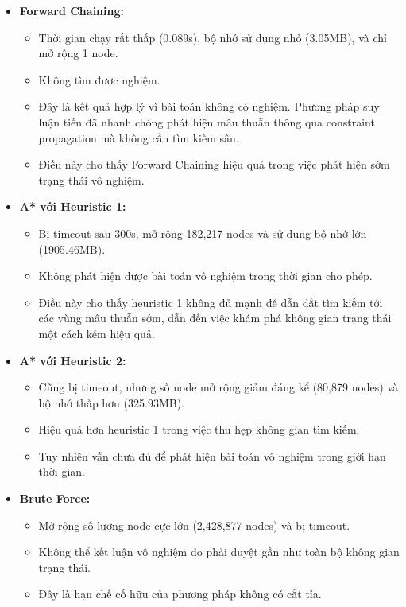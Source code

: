 \begin{itemize}
\item \textbf{Forward Chaining:}
\begin{itemize}
    \item Thời gian chạy rất thấp (0.089s), bộ nhớ sử dụng nhỏ (3.05MB), và chỉ mở rộng 1 node.
    \item Không tìm được nghiệm.
    \item Đây là kết quả hợp lý vì bài toán không có nghiệm. Phương pháp suy luận tiến đã nhanh chóng phát hiện mâu thuẫn thông qua constraint propagation mà không cần tìm kiếm sâu.
    \item Điều này cho thấy Forward Chaining hiệu quả trong việc phát hiện sớm trạng thái vô nghiệm.
\end{itemize}

\item \textbf{A* với Heuristic 1:}
\begin{itemize}
    \item Bị timeout sau 300s, mở rộng 182,217 nodes và sử dụng bộ nhớ lớn (1905.46MB).
    \item Không phát hiện được bài toán vô nghiệm trong thời gian cho phép.
    \item Điều này cho thấy heuristic 1 không đủ mạnh để dẫn dắt tìm kiếm tới các vùng mâu thuẫn sớm, dẫn đến việc khám phá không gian trạng thái một cách kém hiệu quả.
\end{itemize}

\item \textbf{A* với Heuristic 2:}
\begin{itemize}
    \item Cũng bị timeout, nhưng số node mở rộng giảm đáng kể (80,879 nodes) và bộ nhớ thấp hơn (325.93MB).
    \item Hiệu quả hơn heuristic 1 trong việc thu hẹp không gian tìm kiếm.
    \item Tuy nhiên vẫn chưa đủ để phát hiện bài toán vô nghiệm trong giới hạn thời gian.
\end{itemize}

\item \textbf{Brute Force:}
\begin{itemize}
    \item Mở rộng số lượng node cực lớn (2,428,877 nodes) và bị timeout.
    \item Không thể kết luận vô nghiệm do phải duyệt gần như toàn bộ không gian trạng thái.
    \item Đây là hạn chế cố hữu của phương pháp không có cắt tỉa.
\end{itemize}


\end{itemize}
